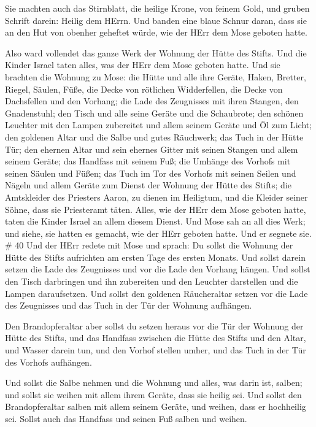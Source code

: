  Sie machten auch das Stirnblatt, die heilige Krone, von
feinem Gold, und gruben Schrift darein: Heilig dem HErrn. 
Und banden eine blaue Schnur daran, dass sie an den Hut von obenher
geheftet würde, wie der HErr dem Mose geboten hatte.

 Also ward vollendet das ganze Werk der Wohnung der Hütte
des Stifts. Und die Kinder Israel taten alles, was der HErr dem Mose
geboten hatte.  Und sie brachten die Wohnung zu Mose: die
Hütte und alle ihre Geräte, Haken, Bretter, Riegel, Säulen, Füße,
 die Decke von rötlichen Widderfellen, die Decke von
Dachsfellen und den Vorhang;  die Lade des Zeugnisses mit
ihren Stangen, den Gnadenstuhl;  den Tisch und alle seine
Geräte und die Schaubrote;  den schönen Leuchter mit den
Lampen zubereitet und allem seinem Geräte und Öl zum Licht;
 den goldenen Altar und die Salbe und gutes Räuchwerk; das
Tuch in der Hütte Tür;  den ehernen Altar und sein ehernes
Gitter mit seinen Stangen und allem seinem Geräte; das Handfass mit
seinem Fuß;  die Umhänge des Vorhofs mit seinen Säulen und
Füßen; das Tuch im Tor des Vorhofs mit seinen Seilen und Nägeln und
allem Geräte zum Dienst der Wohnung der Hütte des Stifts; 
die Amtskleider des Priesters Aaron, zu dienen im Heiligtum, und die
Kleider seiner Söhne, dass sie Priesteramt täten.  Alles,
wie der HErr dem Mose geboten hatte, taten die Kinder Israel an allem
diesem Dienst.  Und Mose sah an all dies Werk; und siehe,
sie hatten es gemacht, wie der HErr geboten hatte. Und er segnete sie.
\# 40  Und der HErr redete mit Mose und sprach: 
Du sollst die Wohnung der Hütte des Stifts aufrichten am ersten Tage des
ersten Monats.  Und sollst darein setzen die Lade des
Zeugnisses und vor die Lade den Vorhang hängen.  Und sollst
den Tisch darbringen und ihn zubereiten und den Leuchter darstellen und
die Lampen daraufsetzen.  Und sollst den goldenen
Räucheraltar setzen vor die Lade des Zeugnisses und das Tuch in der Tür
der Wohnung aufhängen.

 Den Brandopferaltar aber sollst du setzen heraus vor die
Tür der Wohnung der Hütte des Stifts,  und das Handfass
zwischen die Hütte des Stifts und den Altar, und Wasser darein tun,
 und den Vorhof stellen umher, und das Tuch in der Tür des
Vorhofs aufhängen.

 Und sollst die Salbe nehmen und die Wohnung und alles, was
darin ist, salben; und sollst sie weihen mit allem ihrem Geräte, dass
sie heilig sei.  Und sollst den Brandopferaltar salben mit
allem seinem Geräte, und weihen, dass er hochheilig sei. 
Sollst auch das Handfass und seinen Fuß salben und weihen.

